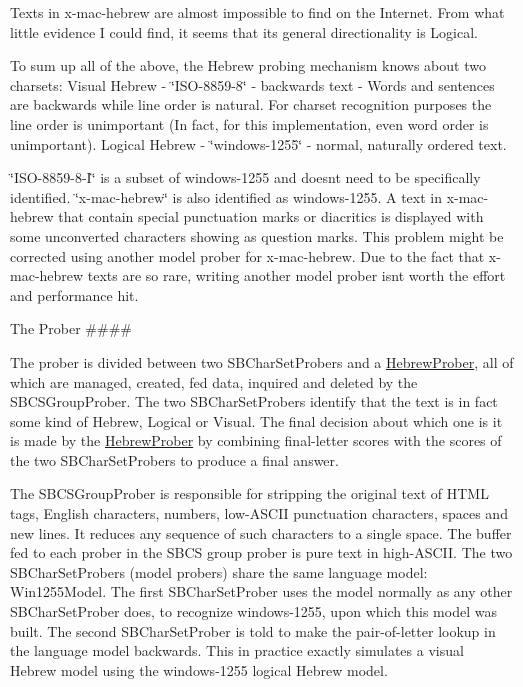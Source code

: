 Texts in x-\/mac-\/hebrew are almost impossible to find on the Internet. From what little evidence I could find, it seems that its general directionality is Logical.

To sum up all of the above, the Hebrew probing mechanism knows about two charsets\+: Visual Hebrew -\/ \char`\"{}\+I\+S\+O-\/8859-\/8\char`\"{} -\/ backwards text -\/ Words and sentences are backwards while line order is natural. For charset recognition purposes the line order is unimportant (In fact, for this implementation, even word order is unimportant). Logical Hebrew -\/ \char`\"{}windows-\/1255\char`\"{} -\/ normal, naturally ordered text.

\char`\"{}\+I\+S\+O-\/8859-\/8-\/\+I\char`\"{} is a subset of windows-\/1255 and doesn\textquotesingle{}t need to be specifically identified. \char`\"{}x-\/mac-\/hebrew\char`\"{} is also identified as windows-\/1255. A text in x-\/mac-\/hebrew that contain special punctuation marks or diacritics is displayed with some unconverted characters showing as question marks. This problem might be corrected using another model prober for x-\/mac-\/hebrew. Due to the fact that x-\/mac-\/hebrew texts are so rare, writing another model prober isn\textquotesingle{}t worth the effort and performance hit.

The Prober \#\#\#\#

The prober is divided between two S\+B\+Char\+Set\+Probers and a \hyperlink{classpip_1_1__vendor_1_1chardet_1_1hebrewprober_1_1HebrewProber}{Hebrew\+Prober}, all of which are managed, created, fed data, inquired and deleted by the S\+B\+C\+S\+Group\+Prober. The two S\+B\+Char\+Set\+Probers identify that the text is in fact some kind of Hebrew, Logical or Visual. The final decision about which one is it is made by the \hyperlink{classpip_1_1__vendor_1_1chardet_1_1hebrewprober_1_1HebrewProber}{Hebrew\+Prober} by combining final-\/letter scores with the scores of the two S\+B\+Char\+Set\+Probers to produce a final answer.

The S\+B\+C\+S\+Group\+Prober is responsible for stripping the original text of H\+T\+ML tags, English characters, numbers, low-\/\+A\+S\+C\+II punctuation characters, spaces and new lines. It reduces any sequence of such characters to a single space. The buffer fed to each prober in the S\+B\+CS group prober is pure text in high-\/\+A\+S\+C\+II. The two S\+B\+Char\+Set\+Probers (model probers) share the same language model\+: Win1255\+Model. The first S\+B\+Char\+Set\+Prober uses the model normally as any other S\+B\+Char\+Set\+Prober does, to recognize windows-\/1255, upon which this model was built. The second S\+B\+Char\+Set\+Prober is told to make the pair-\/of-\/letter lookup in the language model backwards. This in practice exactly simulates a visual Hebrew model using the windows-\/1255 logical Hebrew model.

